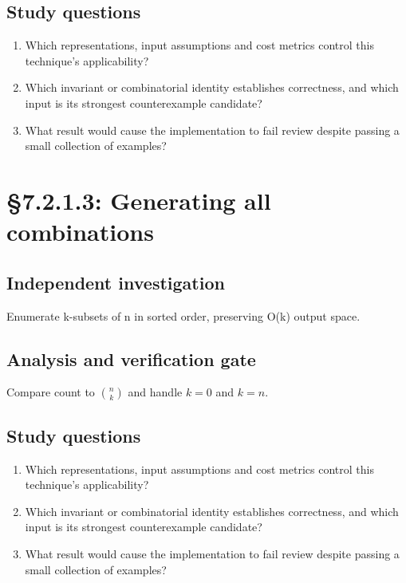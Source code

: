 \documentclass[11pt,letterpaper]{article}
\begin{document}
\subsection{Study questions}
\begin{enumerate}
\item Which representations, input assumptions and cost metrics control this technique's applicability?
\item Which invariant or combinatorial identity establishes correctness, and which input is its strongest counterexample candidate?
\item What result would cause the implementation to fail review despite passing a small collection of examples?
\end{enumerate}

\section{\S 7.2.1.3: Generating all combinations}
\subsection{Independent investigation}
Enumerate k-subsets of n in sorted order, preserving O(k) output space.
\subsection{Analysis and verification gate}
Compare count to $\binom{n}{k}$ and handle $k=0$ and $k=n$.
\subsection{Study questions}
\begin{enumerate}
\item Which representations, input assumptions and cost metrics control this technique's applicability?
\item Which invariant or combinatorial identity establishes correctness, and which input is its strongest counterexample candidate?
\item What result would cause the implementation to fail review despite passing a small collection of examples?
\end{enumerate}
\end{document}
